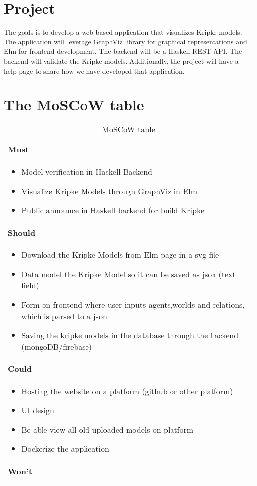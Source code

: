 \section{Project}

The goals is to develop a web-based application that visualizes Kripke models. The application will leverage GraphViz library for graphical representations and Elm for frontend development. The backend will be a Haskell REST API. The backend will validate the Kripke models. Additionally, the project will have a help page to share how we have developed that application. 


\section{The MoSCoW table}
\begin{table}[!htb]
    \centering
    \begin{tabular}{p{}}
         \textbf{Must} \\
         \hline
         \begin{itemize}
             \item Model verification in Haskell Backend
             \item Visualize Kripke Models through GraphViz in Elm  
             \item Public announce in Haskell backend for build Kripke 
         \end{itemize}
        
         \\
         \textbf{Should} \\
         \hline
         \begin{itemize}
             \item Download the Kripke Models from Elm page in a svg file
             \item Data model the Kripke Model so it can be saved as json (text field)
             \item Form on frontend where user inputs agents,worlds and relations, which is parsed to a json
             \item Saving the kripke models in the database through the backend (mongoDB/firebase)
         \end{itemize}
        
         
         \\
         \textbf{Could} \\
         \hline
          \begin{itemize}
        \item Hosting the website on a platform (github or other platform)
         \item UI design
         \item Be able view all old uploaded models on platform
         \item Dockerize the application
         \end{itemize}
         \\
         \textbf{Won't} \\
         \hline
         \\
    \end{tabular}
    \caption{MoSCoW table}
    \label{tab:my_label}
\end{table}
